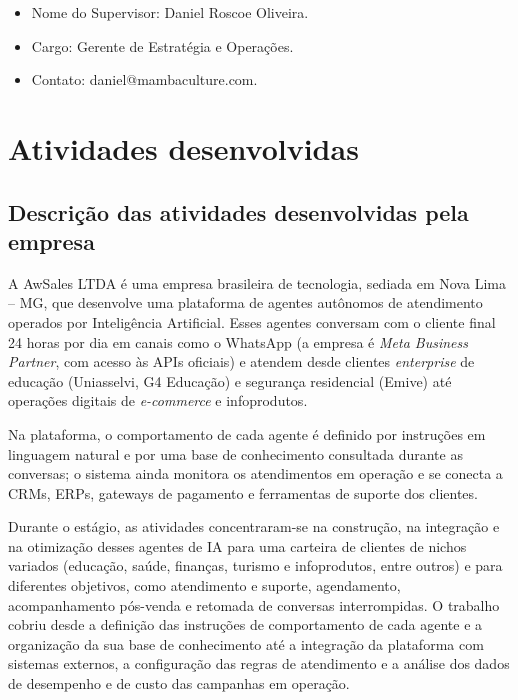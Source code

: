 \documentclass[12pt,a4paper,oneside]{article}
\begin{document}
\begin{itemize}[leftmargin=2em,topsep=0pt]
  \item Nome do Supervisor: Daniel Roscoe Oliveira.
  \item Cargo: Gerente de Estratégia e Operações.
  \item Contato: daniel@mambaculture.com.
\end{itemize}

\section{Atividades desenvolvidas}

\subsection{Descrição das atividades desenvolvidas pela empresa}

A AwSales LTDA é uma empresa brasileira de tecnologia, sediada em Nova Lima -- MG, que desenvolve uma plataforma de agentes autônomos de atendimento operados por Inteligência Artificial. Esses agentes conversam com o cliente final 24 horas por dia em canais como o WhatsApp (a empresa é \textit{Meta Business Partner}, com acesso às APIs oficiais) e atendem desde clientes \textit{enterprise} de educação (Uniasselvi, G4 Educação) e segurança residencial (Emive) até operações digitais de \textit{e-commerce} e infoprodutos.

Na plataforma, o comportamento de cada agente é definido por instruções em linguagem natural e por uma base de conhecimento consultada durante as conversas; o sistema ainda monitora os atendimentos em operação e se conecta a CRMs, ERPs, gateways de pagamento e ferramentas de suporte dos clientes.

Durante o estágio, as atividades concentraram-se na construção, na integração e na otimização desses agentes de IA para uma carteira de clientes de nichos variados (educação, saúde, finanças, turismo e infoprodutos, entre outros) e para diferentes objetivos, como atendimento e suporte, agendamento, acompanhamento pós-venda e retomada de conversas interrompidas. O trabalho cobriu desde a definição das instruções de comportamento de cada agente e a organização da sua base de conhecimento até a integração da plataforma com sistemas externos, a configuração das regras de atendimento e a análise dos dados de desempenho e de custo das campanhas em operação.
\end{document}
